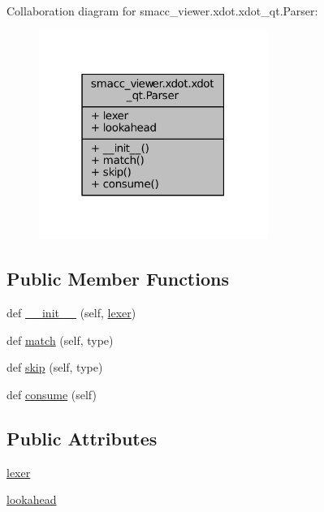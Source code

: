 Collaboration diagram for smacc\+\_\+viewer.\+xdot.\+xdot\+\_\+qt.\+Parser\+:
\nopagebreak
\begin{figure}[H]
\begin{center}
\leavevmode
\includegraphics[width=211pt]{classsmacc__viewer_1_1xdot_1_1xdot__qt_1_1Parser__coll__graph}
\end{center}
\end{figure}
\subsection*{Public Member Functions}
\begin{DoxyCompactItemize}
\item 
def \hyperlink{classsmacc__viewer_1_1xdot_1_1xdot__qt_1_1Parser_abefbee433fb161eb4f71f93523bff075}{\+\_\+\+\_\+init\+\_\+\+\_\+} (self, \hyperlink{classsmacc__viewer_1_1xdot_1_1xdot__qt_1_1Parser_a849927c1fb4026f95914fd8e7b6d5065}{lexer})
\item 
def \hyperlink{classsmacc__viewer_1_1xdot_1_1xdot__qt_1_1Parser_a0c71d82eee6f329e1a1441d0a13c11ce}{match} (self, type)
\item 
def \hyperlink{classsmacc__viewer_1_1xdot_1_1xdot__qt_1_1Parser_a4e2f01d5c182da82a3e0d54e0e5b5143}{skip} (self, type)
\item 
def \hyperlink{classsmacc__viewer_1_1xdot_1_1xdot__qt_1_1Parser_aba6f69f48f1d4e25b13e4cb297f509e6}{consume} (self)
\end{DoxyCompactItemize}
\subsection*{Public Attributes}
\begin{DoxyCompactItemize}
\item 
\hyperlink{classsmacc__viewer_1_1xdot_1_1xdot__qt_1_1Parser_a849927c1fb4026f95914fd8e7b6d5065}{lexer}
\item 
\hyperlink{classsmacc__viewer_1_1xdot_1_1xdot__qt_1_1Parser_a328364d5814b359473e2bf499fbeed85}{lookahead}
\end{DoxyCompactItemize}


